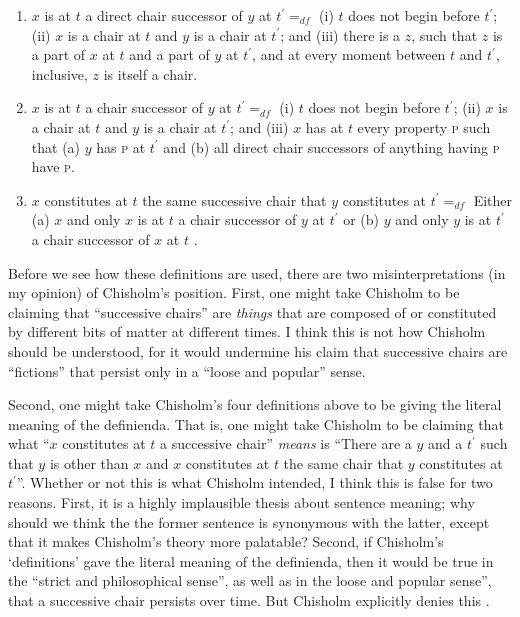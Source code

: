 \documentclass[11pt]{article}
\begin{document}
\begin{spacing}{1.5}
\begin{enumerate}[ref=\arabic*]
  \item $x$ is at $t$ a direct chair successor of $y$ at $t^{\prime}
    =_{df}$ (i) $t$ does not begin before $t^{\prime}$; (ii) $x$ is a
    chair at $t$ and $y$ is a chair at $t^{\prime}$; and (iii) there
    is a $z$, such that $z$ is a part of $x$ at $t$ and a part of $y$
    at $t^{\prime}$, and at every moment between $t$ and $t^{\prime}$,
    inclusive, $z$ is itself a chair. \label{suc1}
  \item $x$ is at $t$ a chair successor of $y$ at $t^{\prime} =_{df}$
    (i) $t$ does not begin before $t^{\prime}$; (ii) $x$ is a chair at
    $t$ and $y$ is a chair at $t^{\prime}$; and (iii) $x$ has at $t$
    every property \textsc{p} such that (a) $y$ has \textsc{p} at
    $t^{\prime}$ and (b) all direct chair successors of anything
    having \textsc{p} have \textsc{p}. \label{suc2}
  \item $x$ constitutes at $t$ the same successive chair that $y$
    constitutes at $t^{\prime} =_{df}$ Either (a) $x$ and only $x$ is
    at $t$ a chair successor of $y$ at $t^{\prime}$ or (b) $y$ and
    only $y$ is at $t^{\prime}$ a chair successor of $x$ at $t$
    \citep[99--100]{chisholm1979}. \label{suc3}
\end{enumerate}

Before we see how these definitions are used, there are two
misinterpretations (in my opinion) of Chisholm's position.  First, one
might take Chisholm to be claiming that ``successive chairs'' are {\em
  things} that are composed of or constituted by different bits of
matter at different times.  I think this is not how Chisholm should be
understood, for it would undermine his claim that successive chairs
are ``fictions'' that persist only in a ``loose and popular'' sense.

Second, one might take Chisholm's four definitions above to be giving
the literal meaning of the definienda.  That is, one might take
Chisholm to be claiming that what ``$x$ constitutes at $t$ a
successive chair'' {\em means} is ``There are a $y$ and a $t^{\prime}$
such that $y$ is other than $x$ and $x$ constitutes at $t$ the same
chair that $y$ constitutes at $t^{\prime}$''.  Whether or not this is
what Chisholm intended, I think this is false for two reasons.  First,
it is a highly implausible thesis about sentence meaning; why should
we think the the former sentence is synonymous with the latter, except
that it makes Chisholm's theory more palatable?  Second, if Chisholm's
`definitions' gave the literal meaning of the definienda, then it
would be true in the ``strict and philosophical sense'', as well as in
the loose and popular sense'', that a successive chair persists over
time.  But Chisholm explicitly denies this
\citeyearpar[96--97]{chisholm1979}.


\end{spacing}
\end{document}
